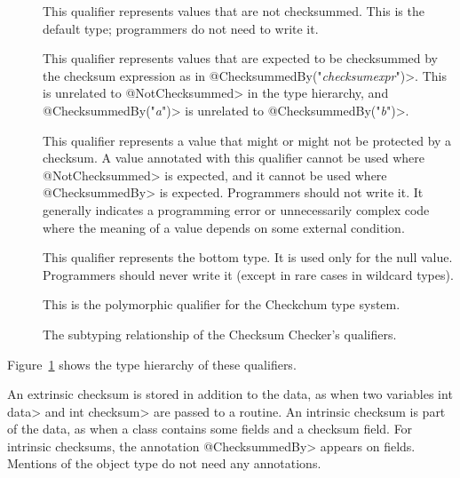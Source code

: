\begin{description}

    \item[]
    This qualifier represents values that are not checksummed.
    This is the default type;  programmers do not need to write it.

    \item[]
    This qualifier represents values that are expected to be checksummed by
    the checksum expression as in \<@ChecksummedBy{\small("\emph{checksumexpr}")}>.
    This is unrelated to \<@NotChecksummed> in the type hierarchy,
    and \<@ChecksummedBy{\small("\emph{a}")}> is unrelated to
    \<@ChecksummedBy{\small("\emph{b}")}>.

    \item[]
    This qualifier represents a value that might or might not be protected by a checksum.
    A value annotated with this qualifier cannot be used where
    \<@NotChecksummed> is expected, and it cannot be used where
    \<@ChecksummedBy> is expected. Programmers should not write it.
    It generally indicates a programming error or unnecessarily complex code where
    the meaning of a value depends on some external condition.

    \item[]
    This qualifier represents the bottom type. It is used only for the null value.
    Programmers should never write it (except in rare cases in wildcard types).

    \item[]
    This is the polymorphic qualifier for the Checkchum type system.

\end{description}

\begin{figure}
    \caption{The subtyping relationship of the Checksum Checker's qualifiers.}
    \label{fig-checksum-hierarchy}
\end{figure}

Figure~\ref{fig-checksum-hierarchy} shows the type hierarchy of these
qualifiers.

An extrinsic checksum is stored in addition to the data, as when two variables
\<int data> and \<int checksum> are passed to a routine.  An intrinsic checksum is part of the data,
as when a class contains some fields and a checksum field.  For intrinsic checksums, the annotation
\<@ChecksummedBy> appears on fields.  Mentions of the object type do not need any annotations.

